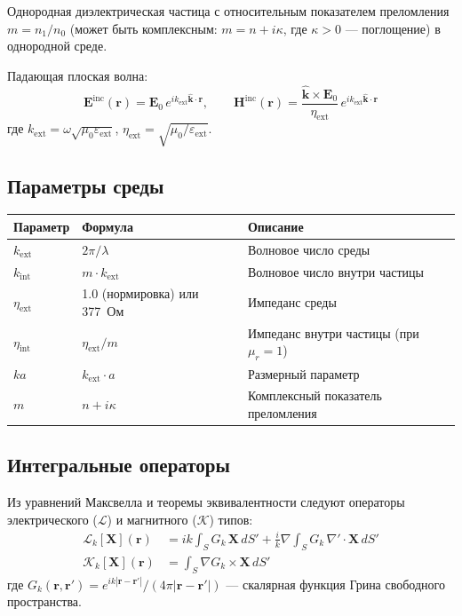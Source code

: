 \documentclass[12pt,a4paper]{article}
\begin{document}
Однородная диэлектрическая частица с относительным показателем преломления $m = n_1/n_0$ (может быть комплексным: $m = n + i\kappa$, где $\kappa > 0$ --- поглощение) в однородной среде.

Падающая плоская волна:
\begin{equation}
  \mathbf{E}^{\mathrm{inc}}(\mathbf{r}) = \mathbf{E}_0 \, e^{i k_{\mathrm{ext}} \hat{\mathbf{k}} \cdot \mathbf{r}}, \qquad
  \mathbf{H}^{\mathrm{inc}}(\mathbf{r}) = \frac{\hat{\mathbf{k}} \times \mathbf{E}_0}{\eta_{\mathrm{ext}}} \, e^{i k_{\mathrm{ext}} \hat{\mathbf{k}} \cdot \mathbf{r}}
\end{equation}
где $k_{\mathrm{ext}} = \omega\sqrt{\mu_0\varepsilon_{\mathrm{ext}}}$, $\eta_{\mathrm{ext}} = \sqrt{\mu_0/\varepsilon_{\mathrm{ext}}}$.

\subsection{Параметры среды}

\begin{center}
\begin{tabular}{lll}
\toprule
Параметр & Формула & Описание \\
\midrule
$k_{\mathrm{ext}}$ & $2\pi/\lambda$ & Волновое число среды \\
$k_{\mathrm{int}}$ & $m \cdot k_{\mathrm{ext}}$ & Волновое число внутри частицы \\
$\eta_{\mathrm{ext}}$ & 1.0 (нормировка) или 377~Ом & Импеданс среды \\
$\eta_{\mathrm{int}}$ & $\eta_{\mathrm{ext}} / m$ & Импеданс внутри частицы (при $\mu_r = 1$) \\
$ka$ & $k_{\mathrm{ext}} \cdot a$ & Размерный параметр \\
$m$ & $n + i\kappa$ & Комплексный показатель преломления \\
\bottomrule
\end{tabular}
\end{center}

\subsection{Интегральные операторы}

Из уравнений Максвелла и теоремы эквивалентности следуют операторы электрического ($\mathcal{L}$) и магнитного ($\mathcal{K}$) типов:
\begin{align}
  \mathcal{L}_k[\mathbf{X}](\mathbf{r}) &= ik \int_S G_k \, \mathbf{X} \, dS'
  + \frac{i}{k} \nabla \int_S G_k \, \nabla' \cdot \mathbf{X} \, dS' \\
  \mathcal{K}_k[\mathbf{X}](\mathbf{r}) &= \int_S \nabla G_k \times \mathbf{X} \, dS'
\end{align}
где $G_k(\mathbf{r},\mathbf{r}') = e^{ik|\mathbf{r}-\mathbf{r}'|} / (4\pi|\mathbf{r}-\mathbf{r}'|)$ --- скалярная функция Грина свободного пространства.
\end{document}
